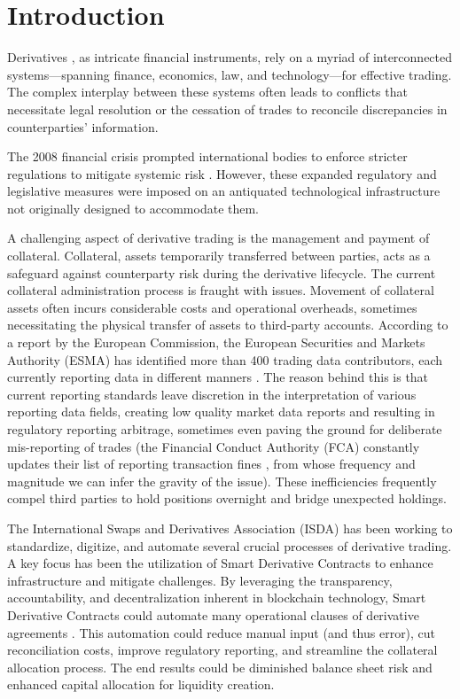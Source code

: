\chapter{Introduction}
\label{ch:Introduction}
Derivatives \citep{quail2002financial}, as intricate financial instruments, rely on a myriad of interconnected systems—spanning finance, economics, law, and technology—for effective trading. The complex interplay between these systems often leads to conflicts that necessitate legal resolution or the cessation of trades to reconcile discrepancies in counterparties' information.

The 2008 financial crisis prompted international bodies to enforce stricter regulations to mitigate systemic risk \citep{ferran2012regulatory}. However, these expanded regulatory and legislative measures were imposed on an antiquated technological infrastructure not originally designed to accommodate them.

A challenging aspect of derivative trading is the management and payment of collateral. Collateral, assets temporarily transferred between parties, acts as a safeguard against counterparty risk during the derivative lifecycle. The current collateral administration process is fraught with issues. Movement of collateral assets often incurs considerable costs and operational overheads, sometimes necessitating the physical transfer of assets to third-party accounts. According to a report by the European Commission, the European Securities and Markets Authority (ESMA) has identified more than 400 trading data contributors, each currently reporting data in different manners \citep{eu_data_fragmentation}. The reason behind this is that current reporting
standards leave discretion in the interpretation of various reporting data fields, creating low quality market data reports and resulting in regulatory reporting
arbitrage, sometimes even paving the ground for deliberate mis-reporting of trades (the Financial Conduct Authority (FCA) constantly updates their list of reporting transaction fines \citep{fca_reporting_fines}, from whose frequency and magnitude we can infer the gravity of the issue). These inefficiencies frequently compel third parties to hold positions overnight and bridge unexpected holdings.

The International Swaps and Derivatives Association (ISDA) \citep{isda_home} has been working to standardize, digitize, and automate several crucial processes of derivative trading. A key focus has been the utilization of Smart Derivative Contracts to enhance infrastructure and mitigate challenges. By leveraging the transparency, accountability, and decentralization inherent in blockchain technology, Smart Derivative Contracts could automate many operational clauses of derivative agreements \citep{clack2018temporal}. This automation could reduce manual input (and thus error), cut reconciliation costs, improve regulatory reporting, and streamline the collateral allocation process. The end results could be diminished balance sheet risk and enhanced capital allocation for liquidity creation.

